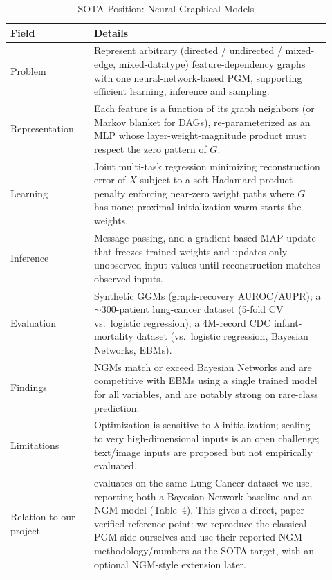 \documentclass[conference]{IEEEtran}
\begin{document}
	\begin{table}[htbp]
		\caption{SOTA Position: Neural Graphical Models \cite{ngm2022}}
		\label{tab:sota}
		\centering
		\begin{tabular}{p{0.24\linewidth} p{0.68\linewidth}}
			\toprule
			\textbf{Field} & \textbf{Details} \\
			\midrule
			Problem & Represent arbitrary (directed / undirected / mixed-edge, mixed-datatype) feature-dependency graphs with one neural-network-based PGM, supporting efficient learning, inference and sampling. \\
			Representation & Each feature is a function of its graph neighbors (or Markov blanket for DAGs), re-parameterized as an MLP whose layer-weight-magnitude product must respect the zero pattern of $G$. \\
			Learning & Joint multi-task regression minimizing reconstruction error of $X$ subject to a soft Hadamard-product penalty enforcing near-zero weight paths where $G$ has none; proximal initialization warm-starts the weights. \\
			Inference & Message passing, and a gradient-based MAP update that freezes trained weights and updates only unobserved input values until reconstruction matches observed inputs. \\
			Evaluation & Synthetic GGMs (graph-recovery AUROC/AUPR); a $\sim$300-patient lung-cancer dataset (5-fold CV vs.\ logistic regression); a 4M-record CDC infant-mortality dataset (vs.\ logistic regression, Bayesian Networks, EBMs). \\
			Findings & NGMs match or exceed Bayesian Networks and are competitive with EBMs using a single trained model for all variables, and are notably strong on rare-class prediction. \\
			Limitations & Optimization is sensitive to $\lambda$ initialization; scaling to very high-dimensional inputs is an open challenge; text/image inputs are proposed but not empirically evaluated. \\
			Relation to our project & \cite{ngm2022} evaluates on the same Lung Cancer dataset we use, reporting both a Bayesian Network baseline and an NGM model (Table~4). This gives a direct, paper-verified reference point: we reproduce the classical-PGM side ourselves and use their reported NGM methodology/numbers as the SOTA target, with an optional NGM-style extension later. \\
			\bottomrule
		\end{tabular}
	\end{table}
	
\end{document}
